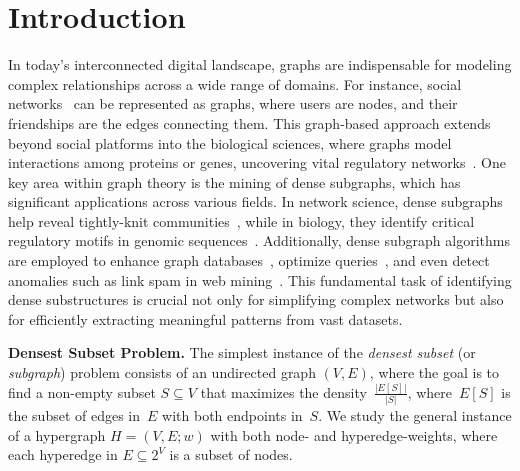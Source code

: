 \section{Introduction}


In today's interconnected digital landscape, graphs are indispensable for modeling complex relationships across a wide range of domains. 
For instance, social networks~\cite{DBLP:journals/pvldb/ChingEKLM15} can be represented as graphs, where users are nodes, and their friendships are the edges connecting them. 
This graph-based approach extends beyond social platforms into the biological sciences, where graphs model interactions among proteins or genes, uncovering vital regulatory networks~\cite{FengSong2021Hmob}. 
One key area within graph theory is the mining of dense subgraphs, which has significant applications across various fields. In network science, dense subgraphs help reveal tightly-knit communities~\cite{DBLP:journals/tweb/DourisboureGP09,DBLP:journals/tkde/ChenS12}, while in biology, they identify critical regulatory motifs in genomic sequences~\cite{DBLP:conf/ismb/FratkinNBB06}. 
Additionally, dense subgraph algorithms are employed to enhance graph databases~\cite{DBLP:journals/pvldb/FangYCLL19}, optimize queries~\cite{DBLP:conf/sigmod/JinXRF09}, and even detect anomalies such as link spam in web mining~\cite{DBLP:conf/vldb/GibsonKT05}. 
This fundamental task of identifying dense substructures is crucial not only for simplifying complex networks but also for efficiently extracting meaningful patterns from vast datasets.



\noindent \textbf{Densest Subset Problem.} The simplest instance of the \emph{densest subset} (or \emph{subgraph}) problem
consists of an undirected graph $(V, E)$,
where the goal is to find a non-empty subset $S \subseteq V$ that maximizes
the density~$\frac{|E[S]|}{|S|}$, where~$E[S]$ is the subset of edges
in~$E$ with both endpoints in~$S$. 
We study the general instance of a hypergraph
$H = (V, E; w)$ with both node- and hyperedge-weights,
where each hyperedge in $E \subseteq 2^V$ is a subset of nodes.



